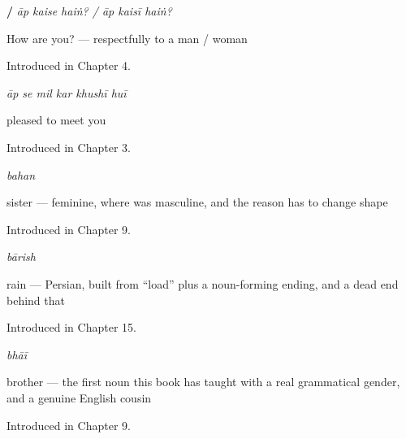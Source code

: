 \noindent\begin{minipage}[t]{\linewidth}
\raggedright
\textbf{   /   }\enspace\emph{āp kaise haiṅ? / āp kaisī haiṅ?}\par
\small How are you? — respectfully to a man / woman\par
\footnotesize Introduced in Chapter 4.
\end{minipage}\par\medskip

\noindent\begin{minipage}[t]{\linewidth}
\raggedright
\textbf{     }\enspace\emph{āp se mil kar khushī huī}\par
\small pleased to meet you\par
\footnotesize Introduced in Chapter 3.
\end{minipage}\par\medskip

\noindent\begin{minipage}[t]{\linewidth}
\raggedright
\textbf{}\enspace\emph{bahan}\par
\small sister — feminine, where  was masculine, and the reason  has to change shape\par
\footnotesize Introduced in Chapter 9.
\end{minipage}\par\medskip

\noindent\begin{minipage}[t]{\linewidth}
\raggedright
\textbf{}\enspace\emph{bārish}\par
\small rain — Persian, built from \textquotedblleft{}load\textquotedblright{} plus a noun-forming ending, and a dead end behind that\par
\footnotesize Introduced in Chapter 15.
\end{minipage}\par\medskip

\noindent\begin{minipage}[t]{\linewidth}
\raggedright
\textbf{}\enspace\emph{bhāī}\par
\small brother — the first noun this book has taught with a real grammatical gender, and a genuine English cousin\par
\footnotesize Introduced in Chapter 9.
\end{minipage}\par\medskip

